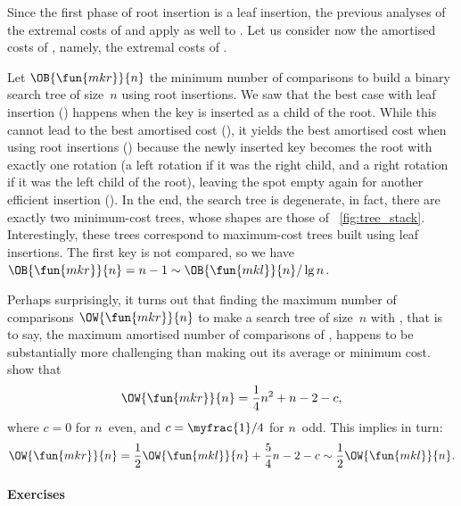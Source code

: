 
Since the first phase of root insertion is a leaf insertion, the
previous analyses of the extremal costs of  and
 apply as well to . Let us consider now
the amortised costs of , namely, the extremal costs of
.

Let \(\OB{\fun{mkr}}{n}\) the minimum
number of comparisons to build a binary search tree of size~\(n\)
using root insertions. We saw that the best case with leaf insertion
() happens when the key is inserted as a child of the
root. While this cannot lead to the best amortised cost (),
it yields the best amortised cost when using root insertions
() because the newly inserted key becomes the root with
exactly one rotation (a left rotation if it was the right child, and a
right rotation if it was the left child of the root), leaving the spot
empty again for another efficient insertion (). In the
end, the search tree is degenerate, in fact, there are exactly two
minimum\hyp{}cost trees, whose shapes are those of
\fig~\vref{fig:tree_stack}. Interestingly, these trees correspond to
maximum\hyp{}cost trees built using leaf insertions. The first key is
not compared, so we have \(\OB{\fun{mkr}}{n} = n - 1 \sim
\OB{\fun{mkl}}{n}/\lg n\).

Perhaps surprisingly, it turns out that finding the maximum number of
comparisons \(\OW{\fun{mkr}}{n}\)
to make a search tree of size~\(n\) with , that is to say,
the maximum amortised number of comparisons of , happens
to be substantially more challenging than making out its average or
minimum cost. \cite{GeldenhuysVanderMerwe_2009} show that
\begin{equation*}
\OW{\fun{mkr}}{n} = \frac{1}{4}n^2 + n - 2 - c,
\end{equation*}
where \(c = 0\) for \(n\)~even, and \(c=\myfrac{1}/{4}\) for
\(n\)~odd. This implies in turn:
\begin{equation*}
\OW{\fun{mkr}}{n} = \frac{1}{2}\OW{\fun{mkl}}{n} + \frac{5}{4}n - 2 -
c \sim \frac{1}{2}\OW{\fun{mkl}}{n}.
\end{equation*}

\paragraph{Exercises}

